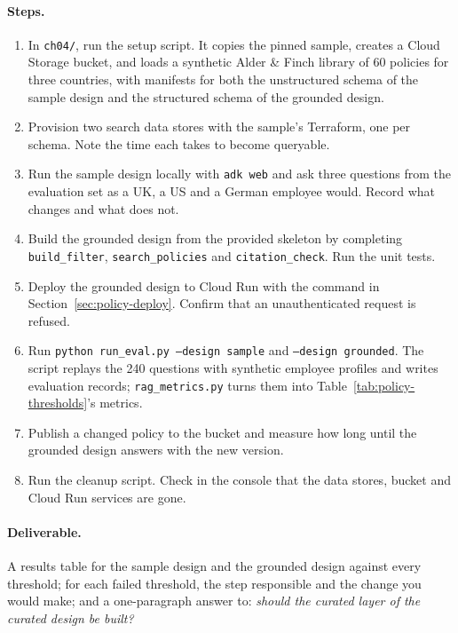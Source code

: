 \paragraph{Steps.}
\begin{enumerate}[itemsep=2pt]
  \item In \texttt{ch04/}, run the setup script. It copies the pinned sample, creates a Cloud Storage bucket, and loads a synthetic Alder \& Finch library of 60 policies for three countries, with manifests for both the unstructured schema of the sample design and the structured schema of the grounded design.
  \item Provision two search data stores with the sample's Terraform, one per schema. Note the time each takes to become queryable.
  \item Run the sample design locally with \texttt{adk web} and ask three questions from the evaluation set as a UK, a US and a German employee would. Record what changes and what does not.
  \item Build the grounded design from the provided skeleton by completing \texttt{build\_filter}, \texttt{search\_policies} and \texttt{citation\_check}. Run the unit tests.
  \item Deploy the grounded design to Cloud Run with the command in Section~\ref{sec:policy-deploy}. Confirm that an unauthenticated request is refused.
  \item Run \texttt{python run\_eval.py --design sample} and \texttt{--design grounded}. The script replays the 240 questions with synthetic employee profiles and writes evaluation records; \texttt{rag\_metrics.py} turns them into Table~\ref{tab:policy-thresholds}'s metrics.
  \item Publish a changed policy to the bucket and measure how long until the grounded design answers with the new version.
  \item Run the cleanup script. Check in the console that the data stores, bucket and Cloud Run services are gone.
\end{enumerate}

\paragraph{Deliverable.} A results table for the sample design and the grounded design against every threshold; for each failed threshold, the step responsible and the change you would make; and a one-paragraph answer to: \emph{should the curated layer of the curated design be built?}


